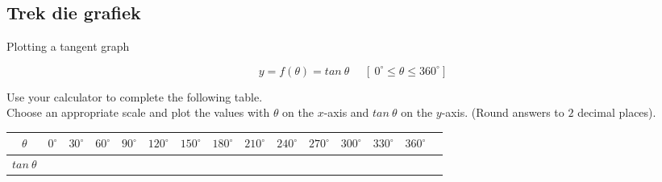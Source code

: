 \subsection*{Trek die grafiek}
\begin{wex}
{Plotting a tangent graph}
{
\begin{equation*}
 y=f(\theta)=tan ~\theta~~~~~~[~0^{\circ} \leq \theta \leq 360^{\circ}]
\end{equation*}

Use your calculator to complete the following table. \\
Choose an appropriate scale and plot the values with $\theta $ on the $x$-axis and $tan ~\theta$ on the $y$-axis. (Round answers to $2$ decimal places). 

\begin{table}[H]
\begin{tabular}{|c|m{0.3cm}|m{0.4cm}|m{0.4cm}|m{0.4cm}|m{0.5cm}|m{0.5cm}|m{0.5cm}|m{0.5cm}|m{0.5cm}|m{0.5cm}|m{0.5cm}|m{0.5cm}|m{0.5cm}|} \hline

\footnotesize$\theta $&
\footnotesize$0^{\circ }$&
\footnotesize$30^{\circ }$&
\footnotesize$60^{\circ }$&
\footnotesize$90^{\circ }$&
\footnotesize$120^{\circ }$&
\footnotesize$150^{\circ }$&
\footnotesize$180^{\circ }$&
\footnotesize$210^{\circ }$&
\footnotesize$240^{\circ }$&
\footnotesize$270^{\circ }$&
\footnotesize$300^{\circ }$&
\footnotesize$330^{\circ }$&
\footnotesize$360^{\circ }$
\\ \hline

\footnotesize$tan ~\theta $&
&
&
&
&
&
&
&
&
&
&
&
&
&

 \hline
\end{tabular}


\end{table}}
\end{wex}
